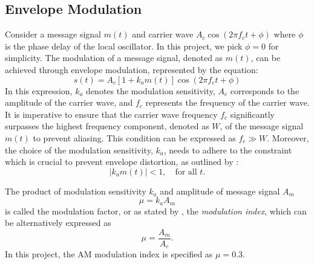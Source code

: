 \documentclass[../ECE459FinalProjectReport.tex]{subfiles}
\begin{document}
\subsection{Envelope Modulation}
Consider a message signal $m\left(t\right)$ and carrier wave $A_c \cos\left(2\pi f_c t + \phi\right)$ where $\phi$ is the phase delay of the local oscillator. In this project, we pick $\phi = 0$ for simplicity. The modulation of a message signal, denoted as $m\left(t\right)$, can be achieved through envelope modulation, represented by the equation:
\begin{equation}
    s\left(t\right) = A_c \left[1 + k_a m\left(t\right)\right] \cos \left(2\pi f_c t + \phi\right)
\end{equation}
In this expression, $k_a$ denotes the modulation sensitivity, $A_c$ corresponds to the amplitude of the carrier wave, and $f_c$ represents the frequency of the carrier wave. It is imperative to ensure that the carrier wave frequency $f_c$ significantly surpasses the highest frequency component, denoted as $W$, of the message signal $m\left(t\right)$ to prevent aliasing. This condition can be expressed as $f_c \gg W$. Moreover, the choice of the modulation sensitivity, $k_a$, needs to adhere to the constraint which is crucial to prevent envelope distortion, as outlined by \textcite[pp. 101--102]{haykinIntroductionAnalogDigital2007}:
\begin{equation}
    \left| k_a m\left(t\right) \right| < 1, \quad \text{for all }t.
\end{equation}

The product of modulation sensitivity $k_a$ and amplitude of message signal $A_m$
\begin{equation}
    \mu = k_a A_m
\end{equation}
is called the modulation factor, or as stated by \cite{sasmitaModulationIndexModulation2020}, the \textit{modulation index}, which can be alternatively expressed as
\begin{equation}
    \mu = \frac{A_m}{A_c}.
\end{equation}
In this project, the AM modulation index is specified as $\mu=0.3$.
\end{document}
